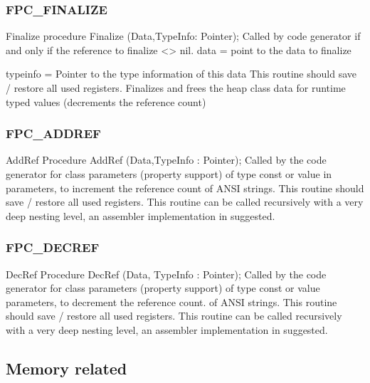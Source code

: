 \documentclass [12pt]{article}
\begin{document}
\subsubsection{FPC{\_}FINALIZE}
\label{subsubsec:mylabel72}

\begin{procedure}{Finalize}
\Declaration
procedure Finalize (Data,TypeInfo: Pointer);
\Description 
Called by code generator if and only if the reference to finalize <> nil.
\Parameters 
data = point to the data to finalize \par 
typeinfo = Pointer to the type information of this data 
\Notes 
This routine should save / restore all used registers. Finalizes and frees
the heap class data for runtime typed values (decrements the reference
count)
\end{procedure}

\subsubsection{FPC{\_}ADDREF}
\label{subsubsec:mylabel73}

\begin{procedure}{AddRef}
\Declaration
Procedure AddRef (Data,TypeInfo : Pointer);
\Description 
Called by the code generator for class parameters (property support) of type
const or value in parameters, to increment the reference count of ANSI
strings.
\Notes 
This routine should save / restore all used registers. This routine can be
called recursively with a very deep nesting level, an assembler
implementation in suggested.
\end{procedure}

\subsubsection{FPC{\_}DECREF}
\label{subsubsec:mylabel74}

\begin{procedure}{DecRef}
\Declaration
Procedure DecRef (Data, TypeInfo : Pointer);
\Description 
Called by the code generator for class parameters (property support) of type
const or value parameters, to decrement the reference count. of ANSI
strings.
\Parameters
\Notes 
This routine should save / restore all used registers. This routine can be
called recursively with a very deep nesting level, an assembler
implementation in suggested.
\end{procedure}

\subsection{Memory related}
\label{subsec:memory}
\end{document}
